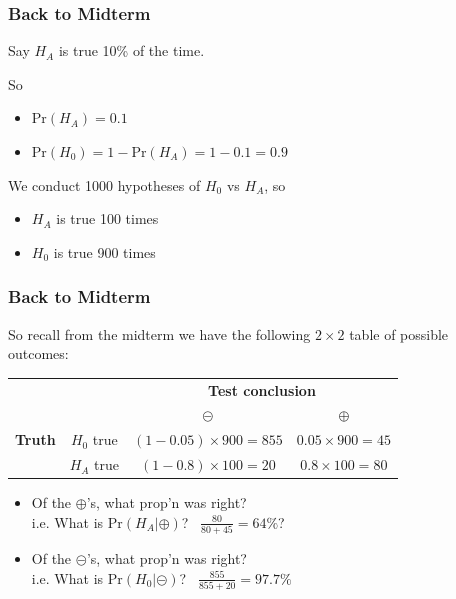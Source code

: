 \documentclass[handout]{beamer}
\newcommand{\prob}{\mbox{Pr}}
\newcommand{\cp}{\oplus}
\newcommand{\cm}{\circleddash}
\begin{document}
\begin{frame}
\frametitle{Back to Midterm}

%
%
Say $H_A$ is true 10\% of the time.

\vspace{0.25cm}

So 
\begin{itemize}
\item $\prob(H_A)=0.1$
\item $\prob(H_0) = 1- \prob(H_A) = 1-0.1=0.9$
\end{itemize}
\pause
\vspace{0.25cm}

We conduct 1000 hypotheses of $H_0$ vs $H_A$, so
\begin{itemize}
\item $H_A$ is true 100 times
\item $H_0$ is true 900 times
\end{itemize}



\end{frame}



\begin{frame}
\frametitle{Back to Midterm}

So recall from the midterm we have the following $2 \times 2$ table of possible outcomes:   

\begin{center}
  \begin{tabular}{cc|cc}
     \multicolumn{2}{c}{}  & \multicolumn{2}{c}{\textbf{Test conclusion}} \\ 
     &  & $\cm$ & $\cp$ \\ 
\hline
    \textbf{Truth} & $H_0$ true & $(1-0.05) \times 900 =  855$ & $0.05 \times 900 = 45$ \\
     & $H_A$ true & $(1-0.8)\times 100=20$ & $0.8\times 100= 80$\\ 
    \hline
  \end{tabular}
\end{center}

%
%
\begin{itemize}
\pause\item Of the $\cp$'s, what prop'n was right?\\
i.e. What is $\prob(H_A|\cp)$? \ $\frac{80}{80+45} = 64\%$?  
\pause\item Of the $\cm$'s, what prop'n was right?\\
i.e. What is $\prob(H_0|\cm)$? \ $\frac{855}{855+20} = 97.7\%$
\end{itemize}

\end{frame}
\end{document}
